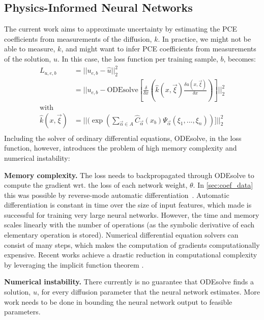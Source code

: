 \documentclass[letterpaper, 10 pt, conference, twocolumn]{ieeeconf}  %
\begin{document}
\subsection{Physics-Informed Neural Networks}
The current work aims to approximate uncertainty by estimating the PCE coefficients from measurements of the diffusion, $k$. In practice, we might not be able to measure, $k$, and might want to infer PCE coefficients from measurements of the solution, $u$. In this case, the loss function per training sample, $b$, becomes: 
\begin{equation}
\begin{aligned}
  L_{u,e,b} &= \lvert\lvert u_{e,b} - \hat u\rvert\rvert_2^2\\
  &= \lvert\lvert u_{e,b} - \text{ODEsolve}[\frac{\delta}{\delta x}(\hat k(x,\vec\xi)\frac{\delta u(x, \vec\xi)}{\delta x})]\rvert\rvert_2^2\\
  \text{with}&\\
  \hat k(x, \vec\xi)&= \lvert\lvert (\exp(\sum_{\vec\alpha \in A} \hat C_{\vec\alpha}(x_b)\Psi_{\vec\alpha}(\xi_1, ..., \xi_n))]\rvert\rvert_2^2\\
\end{aligned}
\label{eq:loss_k}
\end{equation}
Including the solver of ordinary differential equations, ODEsolve, in the loss function, however, introduces the problem of high memory complexity and numerical instability:

\textbf{Memory complexity.} The loss needs to backpropagated through ODEsolve to compute the gradient wrt. the loss of each network weight, $\theta$. In \cref{sec:coef_data} this was possible by reverse-mode automatic differentiation~\cite{Baydin_2017}. Automatic differentiation is constant in time over the size of input features, which made is successful for training very large neural networks. However, the time and memory scales linearly with the number of operations (as the symbolic derivative of each elementary operation is stored). Numerical differential equation solvers can consist of many steps, which makes the computation of gradients computationally expensive. Recent works achieve a drastic reduction in computational complexity by leveraging the implicit function theorem \cite{Li_2020}.

\textbf{Numerical instability.} There currently is no guarantee that ODEsolve finds a solution, $u$, for every diffusion parameter that the neural network estimates. More work needs to be done in bounding the neural network output to feasible parameters.
\end{document}
